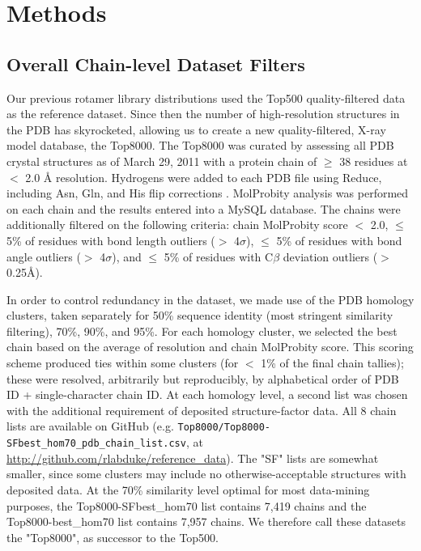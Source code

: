 \section{Methods}
\subsection{\textcolor{changecolor}{Overall} Chain-level Dataset Filters}
Our previous rotamer library distributions \cite{lovell2000penultimate} used the Top500 quality-filtered data \citep{Lovell:2003uq} as the reference dataset. Since then the number of high-resolution structures in the PDB has skyrocketed, allowing us to create a new quality-filtered, X-ray model database, the Top8000. The Top8000 was curated by assessing all PDB crystal structures as of March 29, 2011 with a protein chain of $\ge$ 38 residues at $<$ 2.0 \AA{} resolution. Hydrogens were added to each PDB file using Reduce, including Asn, Gln, and His flip corrections \citep{Word19991735}. MolProbity analysis was performed on each chain \citep{Chen:2010kx} and the results entered into a MySQL database. The chains were additionally filtered on the following criteria: chain MolProbity score $<$ 2.0, $\le$ 5\% of residues with bond length outliers ($>$ 4$\sigma$), $\le$ 5\% of residues with bond angle outliers ($>$ 4$\sigma$), and $\le$ 5\% of residues with C$\beta$ deviation outliers ($>$ 0.25\AA{}).

In order to control redundancy in the dataset, we made use of the PDB homology clusters, taken separately for 50\% sequence identity (most stringent similarity filtering), 70\%, 90\%, and 95\%. For each homology cluster, we selected the best chain based on the average of resolution and chain MolProbity score. This scoring scheme produced ties within some clusters (for $<$ 1\% of the final chain tallies); these were resolved, arbitrarily but reproducibly, by alphabetical order of PDB ID + single-character chain ID. At each homology level, a second list was chosen with the additional requirement of deposited structure-factor data. All 8 chain lists are available on GitHub \citep{Dabbish:2012} (e.g. \texttt{Top8000/Top8000-SFbest\_hom70\_pdb\_chain\_list.csv}, at \url{http://github.com/rlabduke/reference_data}). The "SF" lists are somewhat smaller, since some clusters may include no otherwise-acceptable structures with deposited data. At the 70\% similarity level optimal for most data-mining purposes, the Top8000-SFbest\_hom70 list contains 7,419 chains and the Top8000-best\_hom70 list contains 7,957 chains. \textcolor{changecolor}{We therefore call these datasets the "Top8000", as successor to the Top500.}

